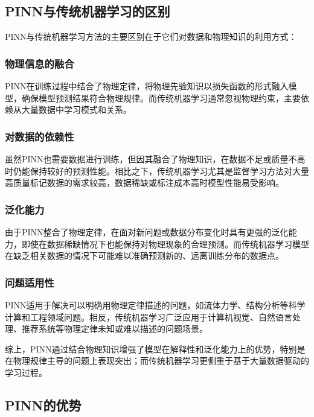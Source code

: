 \subsection{PINN与传统机器学习的区别}

PINN与传统机器学习方法的主要区别在于它们对数据和物理知识的利用方式：

\subsubsection{物理信息的融合}

PINN在训练过程中结合了物理定律，将物理先验知识以损失函数的形式融入模型，确保模型预测结果符合物理规律。而传统机器学习通常忽视物理约束，主要依赖从大量数据中学习模式和关系。

\subsubsection{对数据的依赖性}

虽然PINN也需要数据进行训练，但因其融合了物理知识，在数据不足或质量不高时仍能保持较好的预测性能。相比之下，传统机器学习尤其是监督学习方法对大量高质量标记数据的需求较高，数据稀缺或标注成本高时模型性能易受影响。

\subsubsection{泛化能力}

由于PINN整合了物理定律，在面对新问题或数据分布变化时具有更强的泛化能力，即使在数据稀缺情况下也能保持对物理现象的合理预测。而传统机器学习模型在缺乏相关数据的情况下可能难以准确预测新的、远离训练分布的数据点。

\subsubsection{问题适用性}

PINN适用于解决可以明确用物理定律描述的问题，如流体力学、结构分析等科学计算和工程领域问题。相反，传统机器学习广泛应用于计算机视觉、自然语言处理、推荐系统等物理定律未知或难以描述的问题场景。

综上，PINN通过结合物理知识增强了模型在解释性和泛化能力上的优势，特别是在物理规律主导的问题上表现突出；而传统机器学习更侧重于基于大量数据驱动的学习过程。

\subsection{PINN的优势}

